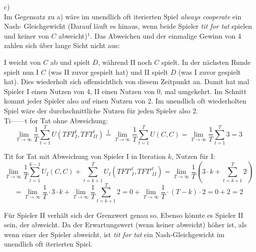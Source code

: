 \documentclass{scrartcl}
\begin{document}
c) \\

Im Gegensatz zu a) wäre im unendlich oft iterierten Spiel \textsl{always cooperate} ein Nash-
Gleichgewicht (Darauf läuft es hinaus, wenn beide Spieler \textsl{tit for tat} spielen und keiner
von $C$ abweicht)$^1$. Das Abweichen und der einmalige Gewinn von 4 zahlen sich über lange Sicht
nicht aus:

I weicht von $C$ ab und spielt $D$, während II noch $C$ spielt. In der nächsten Runde spielt
nun I $C$ (was II zuvor gespielt hat) und II spielt $D$ (was I zuvor gespielt hat). Dies
wiederholt sich offensichtlich von diesem Zeitpunkt an. Damit hat mal Spieler I einen Nutzen von
4, II einen Nutzen von 0, mal umgekehrt. Im Schnitt kommt jeder Spieler also auf einen Nutzen
von 2. Im unendlich oft wiederholten Spiel wäre der durchschnittliche Nutzen für jeden Spieler
also 2. \\

Ti------t for Tat ohne Abweichung: \\

\[
\lim_{T \to \infty} \frac{1}{T} \sum_{t=1}^{T} U(TFT^t_I, TFT^t_{II}) \overset{1}= \lim_{T \to \infty} 
\frac{1}{T} \sum_{t=1}^{T} U(C, C) = \lim_{T \to \infty} \frac{1}{T} \sum_{t=1}^{T} 3 = 3
\]

Tit for Tat mit Abweichung von Spieler I in Iteration $k$, Nutzen für I: \\

\[
\lim_{T \to \infty} \frac{1}{T} \sum_{t=1}^{k-1} U_I(C, C) + \sum_{t = k+1}^{T}
U_I(TFT'^t_I, TFT'^t_{II}) = \lim_{T \to \infty} \frac{1}{T} ( 3 \cdot k + \sum_{t = k+1}^{T}
2)
\]
\[
= \lim_{T \to \infty} \frac{1}{T} \cdot 3 \cdot k + \lim_{T \to \infty} \frac{1}{T}
\sum_{t = k+1}^{T} 2 = 0 + \lim_{T \to \infty} \frac{1}{T} \cdot (T - k) \cdot 2 = 0 + 2 = 2
\]

Für Spieler II verhält sich der Grenzwert genau so. Ebenso könnte es Spieler II sein, der abweicht.
Da der Erwartungswert (wenn keiner abweicht) höher ist, als wenn einer der Spieler abweicht, ist
\textsl{tit for tat} ein Nash-Gleichgewicht im unendlich oft iterierten Spiel.
\end{document}
